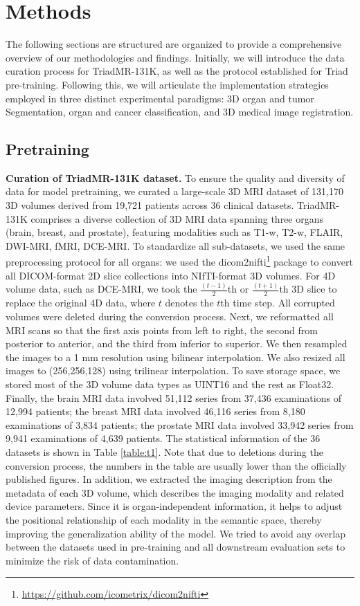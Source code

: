 \section{Methods}

The following sections are structured are organized to provide a comprehensive overview of our methodologies and findings. Initially, we will introduce the data curation process for TriadMR-131K, as well as the protocol established for Triad pre-training. Following this, we will articulate the implementation strategies employed in three distinct experimental paradigms: 3D organ and tumor Segmentation, organ and cancer classification, and 3D medical image registration. 

\subsection{Pretraining}
\label{sec:data}

\noindent \textbf{Curation of TriadMR-131K dataset.} To ensure the quality and diversity of data for model pretraining, we curated a large-scale 3D MRI dataset of 131,170 3D volumes derived from 19,721 patients across 36 clinical datasets. TriadMR-131K comprises a diverse collection of 3D MRI data spanning three organs (brain, breast, and prostate), featuring modalities such as T1-w, T2-w, FLAIR, DWI-MRI, fMRI, DCE-MRI.
To standardize all sub-datasets, we used the same preprocessing protocol for all organs: we used the dicom2nifti\footnote{\url{https://github.com/icometrix/dicom2nifti}} package to convert all DICOM-format 2D slice collections into NIfTI-format 3D volumes. For 4D volume data, such as DCE-MRI, we took the $\frac{(t-1)}{2}$th or $\frac{(t+1)}{2}$th 3D slice to replace the original 4D data, where $t$ denotes the $t$th time step. All corrupted volumes were deleted during the conversion process.
Next, we reformatted all MRI scans so that the first axis points from left to right, the second from posterior to anterior, and the third from inferior to superior. We then resampled the images to a 1 mm resolution using bilinear interpolation. We also resized all images to (256,256,128) using trilinear interpolation.
To save storage space, we stored most of the 3D volume data types as UINT16 and the rest as Float32.
Finally, the brain MRI data involved 51,112 series from 37,436 examinations of 12,994 patients; the breast MRI data involved 46,116 series from 8,180 examinations of 3,834 patients; the prostate MRI data involved 33,942 series from 9,941 examinations of 4,639 patients. The statistical information of the 36 datasets is shown in Table \ref{table:t1}. Note that due to deletions during the conversion process, the numbers in the table are usually lower than the officially published figures.
In addition, we extracted the imaging description from the metadata of each 3D volume, which describes the imaging modality and related device parameters. Since it is organ-independent information, it helps to adjust the positional relationship of each modality in the semantic space, thereby improving the generalization ability of the model.
We tried to avoid any overlap between the datasets used in pre-training and all downstream evaluation sets to minimize the risk of data contamination.

